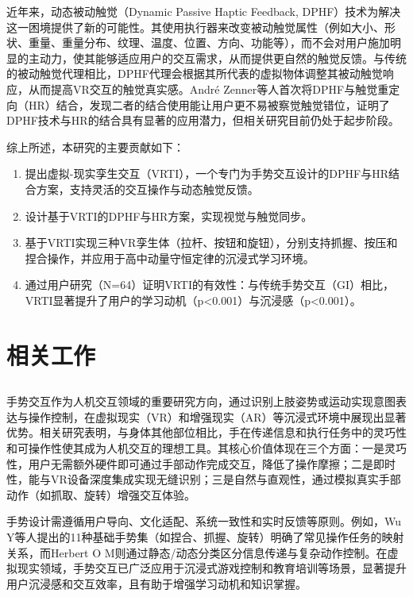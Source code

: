 \documentclass[runningheads]{llncs}
\begin{document}
近年来，动态被动触觉（Dynamic Passive Haptic Feedback, DPHF）技术为解决这一困境提供了新的可能性\cite{zenner2017shifty}。其使用执行器来改变被动触觉属性（例如大小、形状、重量、重量分布、纹理、温度、位置、方向、功能等），而不会对用户施加明显的主动力，使其能够适应用户的交互需求，从而提供更自然的触觉反馈。与传统的被动触觉代理相比，DPHF代理会根据其所代表的虚拟物体调整其被动触觉响应，从而提高VR交互的触觉真实感。André Zenner等人首次将DPHF与触觉重定向（HR）结合，发现二者的结合使用能让用户更不易被察觉触觉错位，证明了DPHF技术与HR的结合具有显著的应用潜力\cite{zenner2021combining}，但相关研究目前仍处于起步阶段。

综上所述，本研究的主要贡献如下：

\begin{enumerate}[label={\arabic*)}]
  \item 提出虚拟-现实孪生交互（VRTI），一个专门为手势交互设计的DPHF与HR结合方案，支持灵活的交互操作与动态触觉反馈。
  \item 设计基于VRTI的DPHF与HR方案，实现视觉与触觉同步。
  \item 基于VRTI实现三种VR孪生体（拉杆、按钮和旋钮），分别支持抓握、按压和捏合操作，并应用于高中动量守恒定律的沉浸式学习环境。
  \item 通过用户研究（N=64）证明VRTI的有效性：与传统手势交互（GI）相比，VRTI显著提升了用户的学习动机（p<0.001）与沉浸感（p<0.001）。
\end{enumerate}

\section{相关工作}
\subsection{} 
手势交互作为人机交互领域的重要研究方向，通过识别上肢姿势或运动实现意图表达与操作控制\cite{yang2019gesture}，在虚拟现实（VR）和增强现实（AR）等沉浸式环境中展现出显著优势\cite{10574578}。相关研究表明，与身体其他部位相比，手在传递信息和执行任务中的灵巧性和可操作性使其成为人机交互的理想工具\cite{karam2006framework}。其核心价值体现在三个方面\cite{mitra2007gesture,10580881,app14114935}：一是灵巧性，用户无需额外硬件即可通过手部动作完成交互，降低了操作摩擦；二是即时性，能与VR设备深度集成实现无缝识别；三是自然与直观性，通过模拟真实手部动作（如抓取、旋转）增强交互体验。

手势设计需遵循用户导向、文化适配、系统一致性和实时反馈等原则\cite{lou2018analysis}。例如，Wu Y等人提出的11种基础手势集（如捏合、抓握、旋转）明确了常见操作任务的映射关系\cite{wu2024empirical}，而Herbert O M则通过静态/动态分类区分信息传递与复杂动作控制\cite{herbert2024static}。在虚拟现实领域，手势交互已广泛应用于沉浸式游戏控制和教育培训等场景\cite{10574578,lu2024chemical}，显著提升用户沉浸感和交互效率\cite{10580881}，且有助于增强学习动机和知识掌握\cite{lu2024chemical}。
\end{document}
